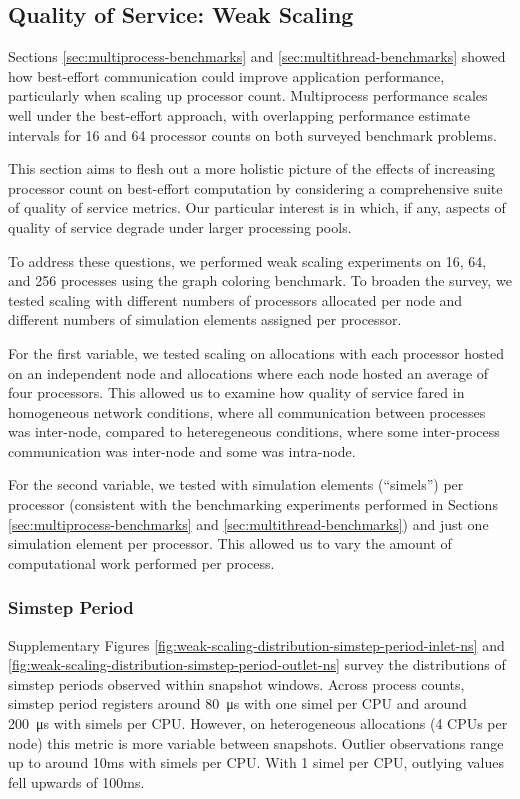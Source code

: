 \subsection{Quality of Service: Weak Scaling}
\label{sec:weak-scaling}

Sections \ref{sec:multiprocess-benchmarks} and \ref{sec:multithread-benchmarks} showed how best-effort communication could improve application performance, particularly when scaling up processor count.
Multiprocess performance scales well under the best-effort approach, with overlapping performance estimate intervals for 16 and 64 processor counts on both surveyed benchmark problems.

This section aims to flesh out a more holistic picture of the effects of increasing processor count on best-effort computation by considering a comprehensive suite of quality of service metrics.
Our particular interest is in which, if any, aspects of quality of service degrade under larger processing pools.

To address these questions, we performed weak scaling experiments on 16, 64, and 256 processes using the graph coloring benchmark.
To broaden the survey, we tested scaling with different numbers of processors allocated per node and different numbers of simulation elements assigned per processor.

For the first variable, we tested scaling on allocations with each processor hosted on an independent node and allocations where each node hosted an average of four processors.
This allowed us to examine how quality of service fared in homogeneous network conditions, where all communication between processes was inter-node, compared to heteregeneous conditions, where some inter-process communication was inter-node and some was intra-node.

For the second variable, we tested with  simulation elements (``simels'') per processor (consistent with the benchmarking experiments performed in Sections \ref{sec:multiprocess-benchmarks} and \ref{sec:multithread-benchmarks}) and just one simulation element per processor.
This allowed us to vary the amount of computational work performed per process.

\subsubsection{Simstep Period}

Supplementary Figures \ref{fig:weak-scaling-distribution-simstep-period-inlet-ns} and \ref{fig:weak-scaling-distribution-simstep-period-outlet-ns} survey the distributions of simstep periods observed within snapshot windows.
Across process counts, simstep period registers around \SI{80}{\micro\second} with one simel per CPU and around \SI{200}{\micro\second} with  simels per CPU.
However, on heterogeneous allocations (4 CPUs per node) this metric is more variable between snapshots.
Outlier observations range up to around 10ms with  simels per CPU.
With 1 simel per CPU, outlying values fell upwards of 100ms.

